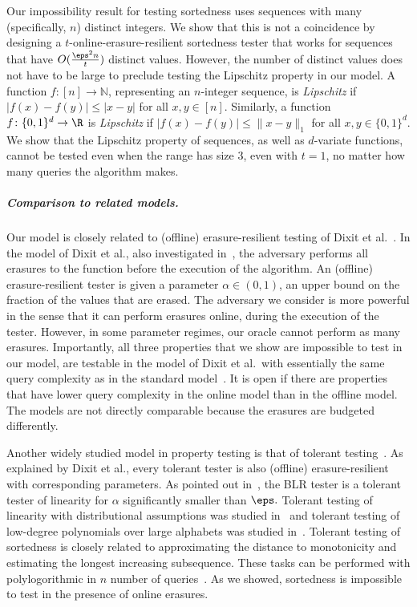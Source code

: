 \documentclass{toc}
\begin{document}
Our impossibility result for testing sortedness uses sequences with many (specifically, $n$) distinct integers. We show that this is not a coincidence by designing a $t$-online-erasure-resilient sortedness tester that works for sequences that have $O(\frac {\eps^2n}{t})$ distinct values. However, the number of distinct values does not have to be large to preclude testing the Lipschitz property in our model. A function $f:[n]\to \mathbb{N}$, representing an $n$-integer sequence, is {\em Lipschitz} 
if $|f(x) - f(y)| \leq |x - y|$ for all $x, y \in [n]$.  Similarly, a function $f \colon \{0, 1\}^d \to \R$ is {\em Lipschitz} if $|f(x) - f(y)| \leq \| x - y \|_1$ for all $x, y \in \{0,1\}^d$. 
We show that the Lipschitz property of sequences, as well as $d$-variate functions, cannot be tested even when the range has size 3, even with $t=1$, no matter how many queries the algorithm makes.


\subparagraph*{Comparison to related models.} Our model is closely related to (offline) erasure-resilient testing of  Dixit et al.~\cite{DixitRTV18}.
In the model of Dixit et al., also investigated in~\cite{RV18,RRV19,BenFLR20,PallavoorRW22,LPRV21,NV20},
 the adversary performs all erasures to the function before the execution of the algorithm. An (offline) erasure-resilient tester is given a parameter $\alpha\in(0,1)$, an upper bound on the fraction of the values that are erased. %
 The adversary we consider is more powerful in the sense that it can perform erasures online, during the execution of the tester. However, in some parameter regimes, our oracle cannot perform as many erasures.
Importantly, all three properties that we show are impossible to test in our model, are testable in the model of Dixit et al.\ with essentially the same query complexity as in the standard model~\cite{DixitRTV18}. 
It is open if there are properties that have lower query complexity in the online model than in the offline model. The models are not directly comparable because the erasures are budgeted differently.

Another widely studied model in property testing is that of tolerant testing~\cite{PRR06}. As explained by Dixit et al., every tolerant tester is also (offline) erasure-resilient with corresponding parameters.
As pointed out in~\cite{PRR06}, the BLR tester is a tolerant tester of linearity for $\alpha$ significantly smaller than $\eps.$ 
Tolerant testing of linearity with distributional assumptions was studied in~\cite{KoppartyS09} and tolerant testing of low-degree polynomials over large alphabets was studied in~\cite{GuruswamiR05}.
%
%
Tolerant testing of sortedness is closely related to approximating the distance to monotonicity and estimating the longest increasing subsequence. These tasks can be performed with polylogorithmic in $n$ number of queries~\cite{PRR06,ACCL07,SaksS17}. As we showed, sortedness is impossible to test in the presence of online erasures. 
\end{document}
